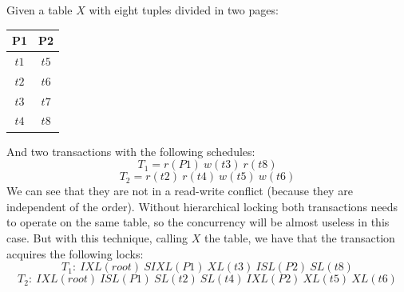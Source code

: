 \documentclass[12pt, a4paper]{report}
\newtheorem[style=M,bodystyle=\normalfont]{theorem}{Theorem}
\newtheorem[style=M,bodystyle=\normalfont]{corollary}{Corollary}
\newtheorem[style=M,bodystyle=\normalfont]{lemma}{Lemma}
\newtheorem[style=M,bodystyle=\normalfont]{definition}{Definition}
\begin{document}
\begin{itemize}
\begin{table}[H]
\begin{tabular}{ccccccc}
            \end{tabular}
        \end{table}
        \begin{example}
            Given a table $X$ with eight tuples divided in two pages: 
            \begin{table}[H]
                \centering
                \begin{tabular}{cc}
                \textbf{P1}                 & \textbf{P2}               \\ \hline
                \multicolumn{1}{|c|}{$t1$}  & \multicolumn{1}{c|}{$t5$} \\ \hline
                \multicolumn{1}{|c|}{$t2$}  & \multicolumn{1}{c|}{$t6$} \\ \hline
                \multicolumn{1}{|c|}{$t3$}  & \multicolumn{1}{c|}{$t7$} \\ \hline
                \multicolumn{1}{|c|}{$t4$}  & \multicolumn{1}{c|}{$t8$} \\ \hline
                \end{tabular}
            \end{table}
            And two transactions with the following schedules: 
            \[T_1=r(P1)\:w(t3)\:r(t8)\]
            \[T_2=r(t2)\:r(t4)\:w(t5)\:w(t6)\]
            We can see that they are not in a read-write conflict (because they are independent of the order). Without hierarchical locking both transactions needs to operate on the 
            same table, so the concurrency will be almost useless in this case. But with this technique, calling $X$ the table, we have that the transaction acquires the following
            locks: 
            \[T_1:\:IXL(root)\:SIXL(P1)\:XL(t3)\:ISL(P2)\:SL(t8)\]
            \[T_2:\:IXL(root)\:ISL(P1)\:SL(t2)\:SL(t4)\:IXL(P2)\:XL(t5)\:XL(t6)\]
        \end{example}
    \end{itemize}
\end{document}
